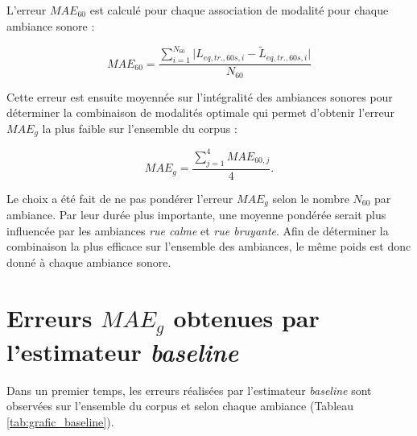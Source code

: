 L'erreur $MAE_{60}$ est calculé pour chaque association de modalité pour chaque ambiance sonore : 

\begin{equation}
MAE_{60} = \frac{\sum_{i = 1}^{N_{60}}\vert L_{eq,tr.,60s, i} - \tilde{L}_{eq,tr.,60s, i}\vert}{N_{60}}
\end{equation}

Cette erreur est ensuite moyennée sur l'intégralité des ambiances sonores pour déterminer la combinaison de modalités optimale qui permet d'obtenir l'erreur $MAE_g$ la plus faible sur l'ensemble du corpus :
  
\begin{equation}
MAE_{g} = \frac{\sum_{j = 1}^4 MAE_{60,j}}{4}.
\end{equation}

Le choix a été fait de ne pas pondérer l'erreur $MAE_{g}$ selon le nombre $N_{60}$ par ambiance. Par leur durée plus importante, une moyenne pondérée serait plus influencée par les ambiances \textit{rue calme} et \textit{rue bruyante}. Afin de déterminer la combinaison la plus efficace sur l'ensemble des ambiances, le même poids est donc donné à chaque ambiance sonore.



\section{Erreurs $MAE_g$ obtenues par l'estimateur \textit{baseline}}
Dans un premier temps, les erreurs réalisées par l'estimateur \textit{baseline} sont observées sur l'ensemble du corpus et selon chaque ambiance (Tableau \ref{tab:grafic_baseline}).

